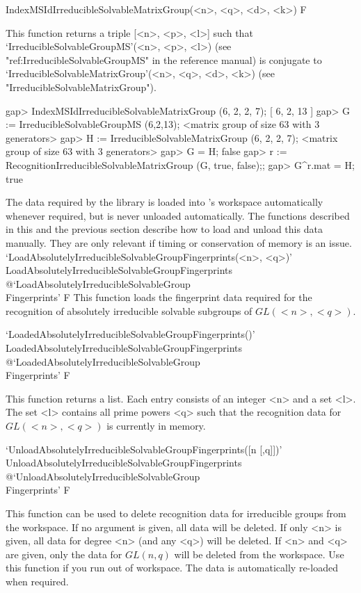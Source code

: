 \>IndexMSIdIrreducibleSolvableMatrixGroup(<n>, <q>, <d>, <k>) F

This function returns a triple [<n>, <p>, <l>] such that
`IrreducibleSolvableGroupMS'(<n>, <p>, <l>) (see "ref:IrreducibleSolvableGroupMS" in the {\GAP} reference manual) is conjugate to
`IrreducibleSolvableMatrixGroup'(<n>, <q>, <d>, <k>) (see "IrreducibleSolvableMatrixGroup").

\beginexample
gap> IndexMSIdIrreducibleSolvableMatrixGroup (6, 2, 2, 7);
[ 6, 2, 13 ]
gap> G := IrreducibleSolvableGroupMS (6,2,13);
<matrix group of size 63 with 3 generators>
gap> H := IrreducibleSolvableMatrixGroup (6, 2, 2, 7);
<matrix group of size 63 with 3 generators>
gap> G = H;
false 
gap> r := RecognitionIrreducibleSolvableMatrixGroup (G, true, false);;
gap> G^r.mat = H;
true
\endexample



The data required by the {\IRREDSOL} library is loaded into {\GAP}'s workspace automatically whenever required, but is never unloaded automatically. The functions described in this
and the previous section describe how to load and unload this data manually. 
They are only relevant if timing or conservation of memory is an issue.
\>`LoadAbsolutelyIrreducibleSolvableGroupFingerprints(<n>, <q>)'%
{LoadAbsolutelyIrreducibleSolvableGroupFingerprints}%
@{`LoadAbsolutelyIrreducibleSolvableGroup\\Fingerprints'} F
This function loads the fingerprint data required for the recognition
of absolutely irreducible solvable subgroups of $GL(<n>, <q>)$.

\>`LoadedAbsolutelyIrreducibleSolvableGroupFingerprints()'%
{LoadedAbsolutelyIrreducibleSolvableGroupFingerprints}%
@{`LoadedAbsolutelyIrreducibleSolvableGroup\\Fingerprints'} F

This function returns a list. Each entry consists of an integer <n> and a set <l>. The set
<l> contains all prime powers <q> such that the recognition data for $GL(<n>, <q>)$ is currently in
memory.

\>`UnloadAbsolutelyIrreducibleSolvableGroupFingerprints([n [,q]])'%
{UnloadAbsolutelyIrreducibleSolvableGroupFingerprints}%
@{`UnloadAbsolutelyIrreducibleSolvableGroup\\Fingerprints'} F

This function can be used to delete recognition data for irreducible groups from the {\GAP} workspace. If no
argument is given, all data will be deleted. If only <n> is given, all data for degree <n> (and any
<q>) will be deleted. If <n> and <q> are given, only the data for $GL(n, q)$ will be deleted from the
{\GAP} workspace. Use this function if you run out of {\GAP} workspace. The
data is automatically re-loaded when required.


